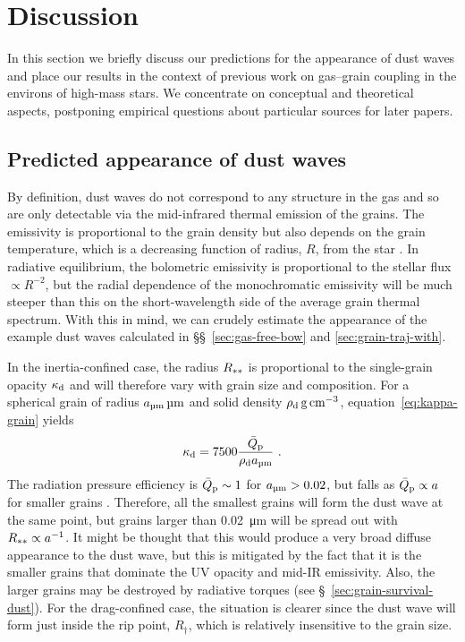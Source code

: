 
\section{Discussion}
\label{sec:discussion}

In this section we briefly discuss our predictions for the
appearance of dust waves and place our results in the context of
previous work on gas--grain coupling in the environs of high-mass
stars.  We concentrate on conceptual and theoretical aspects,
postponing empirical questions about particular sources for later
papers.

\subsection{Predicted appearance of dust waves}
\label{sec:pred-shape-struct}
By definition, dust waves do not correspond to any structure in the
gas and so are only detectable via the mid-infrared thermal emission
of the grains.  The emissivity is proportional to the grain density
but also depends on the grain temperature, which is a decreasing
function of radius, \(R\), from the star \citetext{see, for example,
  synthetic observations in \citealp{Mackey:2016a, Acreman:2016a,
    Meyer:2017a}}.  In radiative equilibrium, the bolometric
emissivity is proportional to the stellar flux \(\propto R^{-2}\), but the
radial dependence of the monochromatic emissivity will be much steeper
than this on the short-wavelength side of the average grain thermal
spectrum.  With this in mind, we can crudely estimate the appearance
of the example dust waves calculated in \S\S~\ref{sec:gas-free-bow}
and \ref{sec:grain-traj-with}.

In the inertia-confined case, the radius \(R\starstar\) is
proportional to the single-grain opacity \(\kappa\grain\) and will
therefore vary with grain size and composition.  For a spherical grain
of radius \(\amu\,\si{\um}\) and solid density
\(\rho\grain \, \si{g.cm^{-3}}\), equation~\eqref{eq:kappa-grain} yields
\begin{equation}
  \label{eq:kappa-d-dependence}
  \kappa\grain = 7500 \frac{\Qpbar}{\rho\grain \amu} \ . 
\end{equation}
The radiation pressure efficiency is \(\Qpbar \sim 1\) for
\(\amu > 0.02\), but falls as \(\Qpbar \propto a\) for smaller grains
\citep[e.g., Fig.~7 of][]{Draine:2011a}.  Therefore, all the smallest
grains will form the dust wave at the same point, but grains larger
than \SI{0.02}{\um} will be spread out with
\(R\starstar \propto a^{-1}\).  It might be thought that this would produce
a very broad diffuse appearance to the dust wave, but this is
mitigated by the fact that it is the smaller grains that dominate the
UV opacity and mid-IR emissivity.  Also, the larger grains may be
destroyed by radiative torques (see \S~\ref{sec:grain-survival-dust}).
For the drag-confined case, the situation is clearer since the dust
wave will form just inside the rip point, \(R_\dag\), which is relatively
insensitive to the grain size.

